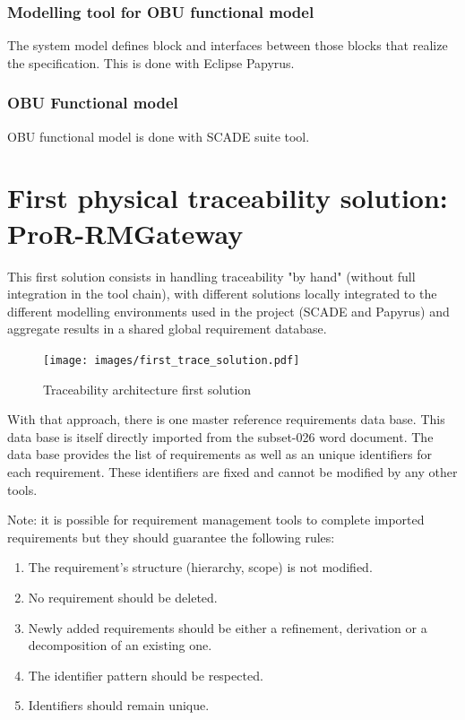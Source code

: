 \documentclass[11pt]{template/openetcs_report}
\begin{document}
\subsection{Modelling tool for OBU functional model}
The system model defines block and interfaces between those blocks that realize
the specification. This is done with Eclipse Papyrus. 

\subsection{OBU Functional model}
\label{sec-10}
OBU functional model is done with SCADE suite tool.

\chapter{First physical traceability solution: ProR-RMGateway}
\label{sec-5}

This first solution consists in handling traceability "by hand" (without full integration in the tool chain), with different solutions locally integrated to the different modelling environments used in the project (SCADE and Papyrus) and aggregate results in a shared global requirement database.

\begin{figure}[htb]
\centering
\texttt{[image: images/first\_trace\_solution.pdf]}
\caption{\label{fig:trace_first}Traceability architecture first solution}
\end{figure}

With that approach, there is one master reference requirements data base. This data
base is itself directly imported from the subset-026 word document. The data
base provides the list of requirements as well as an unique identifiers for each
requirement. These identifiers are fixed and cannot be modified by any other
tools. 

Note: it is possible for requirement management tools to complete imported
requirements but they should guarantee the following rules:
\begin{enumerate}
\item The requirement's structure (hierarchy, scope) is not modified.
\item No requirement should be deleted.
\item Newly added requirements should be either a refinement, derivation or a decomposition of an existing one.
\item The identifier pattern should be respected.
\item Identifiers should remain unique.
\end{enumerate}
\end{document}
